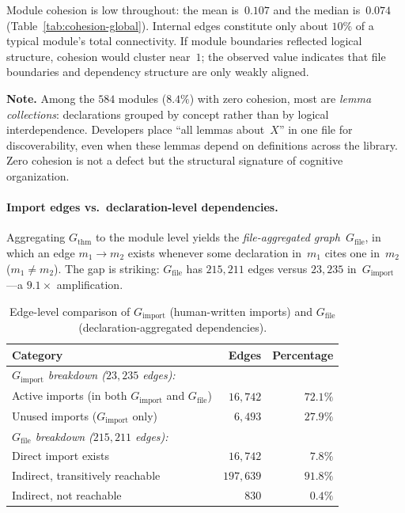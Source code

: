 Module cohesion is low throughout: the mean is~$0.107$ and the median is~$0.074$ (Table~\ref{tab:cohesion-global}). Internal edges constitute only about $10\%$ of a typical module's total connectivity. If module boundaries reflected logical structure, cohesion would cluster near~$1$; the observed value indicates that file boundaries and dependency structure are only weakly aligned.

\noindent\textbf{Note.}
\label{rem:zero-cohesion}
Among the $584$ modules ($8.4\%$) with zero cohesion, most are \emph{lemma collections}: declarations grouped by concept rather than by logical interdependence. Developers place ``all lemmas about~$X$'' in one file for discoverability, even when these lemmas depend on definitions across the library. Zero cohesion is not a defect but the structural signature of cognitive organization.

\paragraph{Import edges vs.\ declaration-level dependencies.}
\label{sec:import_vs_declaration}

\noindent Aggregating $G_{\mathrm{thm}}$ to the module level yields the \emph{file-aggregated graph}~$G_{\mathrm{file}}$, in which an edge $m_1 \to m_2$ exists whenever some declaration in~$m_1$ cites one in~$m_2$ ($m_1 \neq m_2$). The gap is striking: $G_{\mathrm{file}}$ has $215{,}211$ edges versus $23{,}235$ in~$G_{\mathrm{import}}$---a $9.1\times$ amplification.

\begin{table}[ht]
\centering
\caption{Edge-level comparison of $G_{\mathrm{import}}$ (human-written imports) and $G_{\mathrm{file}}$ (declaration-aggregated dependencies).}
\label{tab:import-vs-file}
\begin{tabular}{lrr}
\toprule
Category & Edges & Percentage \\
\midrule
\multicolumn{3}{l}{\emph{$G_{\mathrm{import}}$ breakdown ($23{,}235$ edges):}} \\
\quad Active imports (in both $G_{\mathrm{import}}$ and $G_{\mathrm{file}}$) & $16{,}742$ & $72.1\%$ \\
\quad Unused imports ($G_{\mathrm{import}}$ only) & $6{,}493$ & $27.9\%$ \\
\midrule
\multicolumn{3}{l}{\emph{$G_{\mathrm{file}}$ breakdown ($215{,}211$ edges):}} \\
\quad Direct import exists & $16{,}742$ & $7.8\%$ \\
\quad Indirect, transitively reachable & $197{,}639$ & $91.8\%$ \\
\quad Indirect, not reachable & $830$ & $0.4\%$ \\
\bottomrule
\end{tabular}
\end{table}


